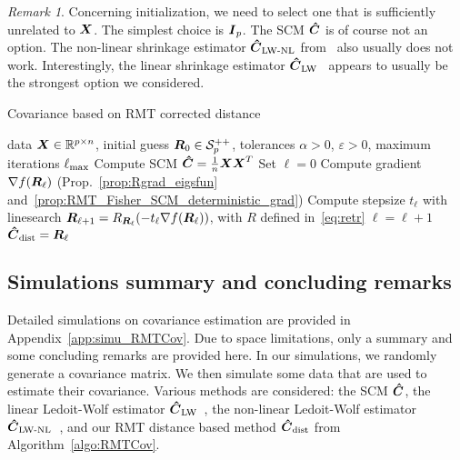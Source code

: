 \documentclass{article}
\theoremstyle{plain}
\theoremstyle{definition}
\theoremstyle{remark}
\newtheorem{remark}[theorem]{Remark}
\begin{document}
\begin{remark}
    Concerning initialization, we need to select one that is sufficiently unrelated to $\boldsymbol{X}$.
    The simplest choice is $\boldsymbol{I}_{p}$.
    The SCM $\boldsymbol{\hat{C}}$ is of course not an option.
    The non-linear shrinkage estimator $\boldsymbol{\hat{C}}_{\textup{LW-NL}}$ from~\cite{ledoit2020analytical} also usually does not work.
    Interestingly, the linear shrinkage estimator $\boldsymbol{\hat{C}}_{\textup{LW}}$~\cite{ledoit2004well} appears to usually be the strongest option we considered.
\end{remark}

\begin{algorithm}[t]
    \caption{Covariance based on RMT corrected distance}
    \label{algo:RMTCov}
    \begin{algorithmic}
            data $\boldsymbol{X}\in\mathbb{R}^{p\times n}$,
            initial guess $\boldsymbol{R}_0\in\mathcal{S}^{++}_{p}$,
            tolerances $\alpha>0$, $\varepsilon>0$,
            maximum iterations $\ell_{\textup{max}}$
        \STATE Compute SCM $\boldsymbol{\hat{C}}=\frac1{n}\boldsymbol{X}\boldsymbol{X}^T$
        \STATE Set $\ell=0$
        \REPEAT
        \STATE Compute gradient $\nabla f(\boldsymbol{R}_{\ell})$ (Prop.~\ref{prop:Rgrad_eigsfun} and~\ref{prop:RMT_Fisher_SCM_deterministic_grad})
        \STATE Compute stepsize $t_{\ell}$ with linesearch
        \STATE $\boldsymbol{R}_{\ell+1} = R_{\boldsymbol{R}_{\ell}}(-t_{\ell}\nabla f(\boldsymbol{R}_{\ell}))$, with $R$ defined in~\eqref{eq:retr}
        \STATE $\ell=\ell+1$
         $\boldsymbol{\hat{C}}_{\textup{dist}}=\boldsymbol{R}_{\ell}$
    \end{algorithmic}
\end{algorithm}


\subsection{Simulations summary and concluding remarks}
\label{sec:cov:simu}
Detailed simulations on covariance estimation are provided in Appendix~\ref{app:simu_RMTCov}.
Due to space limitations, only a summary and some concluding remarks are provided here. 
%
In our simulations, we randomly generate a covariance matrix.
We then simulate some data that are used to estimate their covariance.
%
Various methods are considered:
the SCM $\boldsymbol{\hat{C}}$,
the linear Ledoit-Wolf estimator $\boldsymbol{\hat{C}}_{\textup{LW}}$~\cite{ledoit2004well},
the non-linear Ledoit-Wolf estimator $\boldsymbol{\hat{C}}_{\textup{LW-NL}}$~\cite{ledoit2020analytical},
and our RMT distance based method $\boldsymbol{\hat{C}}_{\textup{dist}}$ from Algorithm~\ref{algo:RMTCov}.
\end{document}
